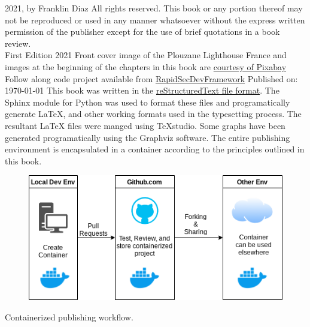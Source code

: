 \justify
\textcopyright{} 2021, by Franklin Diaz
\justify
All rights reserved. This book or any portion thereof
may not be reproduced or used in any manner whatsoever
without the express written permission of the publisher
except for the use of brief quotations in a book review.
\vspace{5mm}\\
First Edition 2021
\justify
Front cover image of the Plouzane Lighthouse France and images at the beginning of the chapters in this book are  \href{https://pixabay.com/service/terms/#license}{courtesy of Pixabay}
\justify
Follow along code project available from {\href{https://github.com/hotpeppersec/rapid_secdev_framework}{RapidSecDevFramework}}
\vspace{3mm}
Published on: \today
\justify
This book was written in the {\href{https://en.wikipedia.org/wiki/ReStructuredTex}{reStructuredText file format}}. The Sphinx module for Python was used to format these files and programatically generate LaTeX, and other working formats used in the typesetting process. The resultant LaTeX files were manged using TeXstudio. Some graphs have been generated programatically using the Graphviz software. The entire publishing environment is encapsulated in a container according to the principles outlined in this book.

\vspace{5mm}
    \centering
\vspace{0mm}
\begin{figure}[!h]
	\centering
	\includegraphics[scale=0.75]{images/workflow.png}
\end{figure}
\vspace{2mm}
Containerized publishing workflow.
